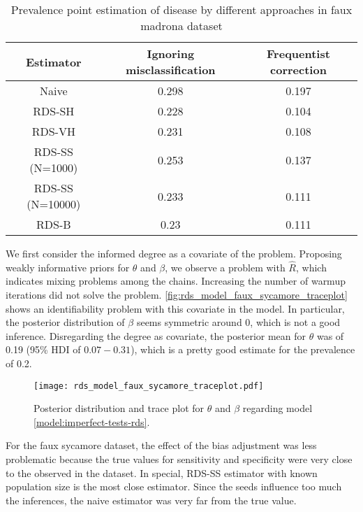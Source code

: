 \begin{table}[htbp]
    \centering
    \caption{\label{tab:results-estimators-faux-madrona-data}Prevalence point estimation of
    disease by different approaches in faux madrona dataset}
    \begin{tabular}{ccc}
    \hline
    Estimator & Ignoring misclassification & Frequentist correction \\ \hline
    Naive & 0.298 & 0.197 \\
    RDS-SH & 0.228 & 0.104 \\
    RDS-VH & 0.231 & 0.108 \\
    RDS-SS (N=1000) & 0.253 & 0.137 \\
    RDS-SS (N=10000) & 0.233 & 0.111 \\
    RDS-B & 0.23 & 0.111 \\ \hline
    \end{tabular}
\end{table}

We first consider the informed degree as a covariate of the problem. Proposing
weakly informative priors for $\theta$ and $\beta$, we observe a problem with
$\hat{R}$, which indicates mixing problems among the chains. Increasing the
number of warmup iterations did not solve the problem.
\autoref{fig:rds_model_faux_sycamore_traceplot} shows an identifiability
problem with this covariate in the model. In particular, the posterior
distribution of $\beta$ seems symmetric around 0, which is not a good
inference. Disregarding the degree as covariate, the posterior mean for $\theta$ was of
0.19 (95\% HDI of $0.07-0.31$), which is a pretty good estimate for the
prevalence of 0.2.

\begin{figure}
    \centering
    \caption{\label{fig:rds_model_faux_sycamore_traceplot}Posterior
    distribution and trace plot for $\theta$ and $\beta$ regarding model
    \eqref{model:imperfect-tests-rds}.}
    \texttt{[image: rds\_model\_faux\_sycamore\_traceplot.pdf]}
\end{figure}

For the faux sycamore dataset, the effect of the bias adjustment was less problematic
because the true values for sensitivity and specificity were very close to the
observed in the dataset. In special, RDS-SS estimator with known population size
is the most close estimator. Since the seeds influence too much the
inferences, the naive estimator was very far from the true value. 


